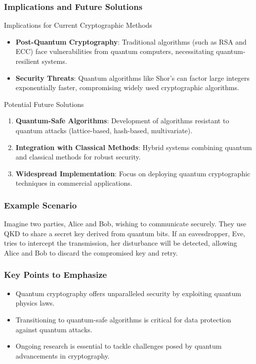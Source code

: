 \documentclass{beamer}
\begin{document}
\begin{frame}[fragile]
    \frametitle{Implications and Future Solutions}
    \begin{block}{Implications for Current Cryptographic Methods}
        \begin{itemize}
            \item \textbf{Post-Quantum Cryptography}: Traditional algorithms (such as RSA and ECC) face vulnerabilities from quantum computers, necessitating quantum-resilient systems.
            \item \textbf{Security Threats}: Quantum algorithms like Shor's can factor large integers exponentially faster, compromising widely used cryptographic algorithms.
        \end{itemize}
    \end{block}

    \begin{block}{Potential Future Solutions}
        \begin{enumerate}
            \item \textbf{Quantum-Safe Algorithms}: Development of algorithms resistant to quantum attacks (lattice-based, hash-based, multivariate).
            \item \textbf{Integration with Classical Methods}: Hybrid systems combining quantum and classical methods for robust security.
            \item \textbf{Widespread Implementation}: Focus on deploying quantum cryptographic techniques in commercial applications.
        \end{enumerate}
    \end{block}
\end{frame}

\begin{frame}[fragile]
    \frametitle{Example Scenario}
    Imagine two parties, Alice and Bob, wishing to communicate securely. They use QKD to share a secret key derived from quantum bits. If an eavesdropper, Eve, tries to intercept the transmission, her disturbance will be detected, allowing Alice and Bob to discard the compromised key and retry.
\end{frame}

\begin{frame}[fragile]
    \frametitle{Key Points to Emphasize}
    \begin{itemize}
        \item Quantum cryptography offers unparalleled security by exploiting quantum physics laws.
        \item Transitioning to quantum-safe algorithms is critical for data protection against quantum attacks.
        \item Ongoing research is essential to tackle challenges posed by quantum advancements in cryptography.
    \end{itemize}
\end{frame}
\end{document}
